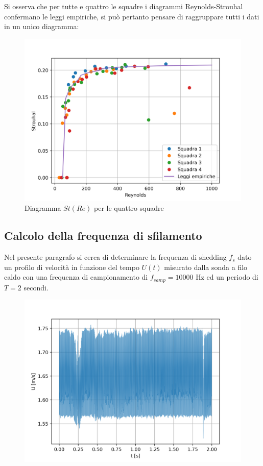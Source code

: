 \newpage
\noindent Si osserva che per tutte e quattro le squadre i diagrammi Reynolds-Strouhal confermano le leggi empiriche, si può pertanto pensare di raggruppare tutti i dati in un unico diagramma:
\begin{figure}[H]
    \centering
    \includegraphics[width=.8\textwidth]{images/10/adim.png}
    \caption{Diagramma $St(Re)$ per le quattro squadre}
\end{figure}

\subsection{Calcolo della frequenza di sfilamento}
Nel presente paragrafo si cerca di determinare la frequenza di shedding $f_s$ dato un profilo di velocità in funzione del tempo $U(t)$ misurato dalla sonda a filo caldo con una frequenza di campionamento di $f_{samp}=10000$ Hz ed un periodo di $T=2$ secondi.
\begin{figure}[H]
    \centering
    \includegraphics[width=.55\textwidth]{images/10/timeseries.png}
\end{figure}

